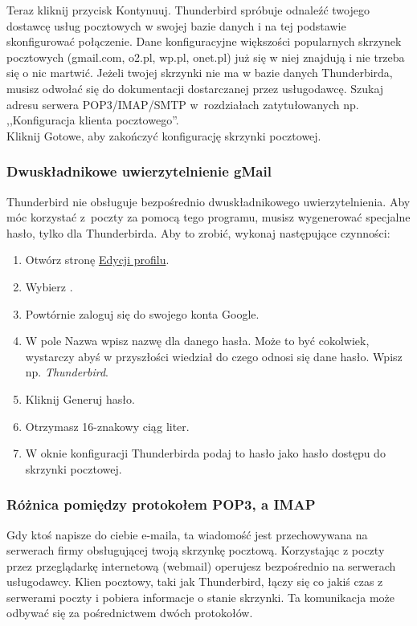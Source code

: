 Teraz kliknij przycisk \textcolor{ubuntu_orange}{Kontynuuj}. Thunderbird spróbuje odnaleźć twojego dostawcę usług pocztowych w swojej bazie danych i na tej podstawie skonfigurować połączenie. Dane konfiguracyjne większości popularnych skrzynek pocztowych (gmail.com, o2.pl, wp.pl, onet.pl) już się w niej znajdują i nie trzeba się o nic martwić. Jeżeli twojej skrzynki nie ma w bazie danych Thunderbirda, musisz odwołać się do dokumentacji dostarczanej przez usługodawcę. Szukaj adresu serwera POP3/IMAP/SMTP w~rozdziałach zatytułowanych np. ,,Konfiguracja klienta pocztowego''.\\
Kliknij \textcolor{ubuntu_orange}{Gotowe}, aby zakończyć konfigurację skrzynki pocztowej.

\subsubsection{Dwuskładnikowe uwierzytelnienie gMail}
Thunderbird nie obsługuje bezpośrednio dwuskładnikowego uwierzytelnienia. Aby móc korzystać z~poczty za pomocą tego programu, musisz wygenerować specjalne hasło, tylko dla Thunderbirda. Aby to zrobić, wykonaj następujące czynności:
\begin{enumerate}
\item Otwórz stronę \href{https://www.google.com/settings/personalinfo}{Edycji profilu}.
\item Wybierz .
\item Powtórnie zaloguj się do swojego konta Google.
\item W pole \textcolor{ubuntu_orange}{Nazwa} wpisz nazwę dla danego hasła. Może to być cokolwiek, wystarczy abyś w przyszłości wiedział do czego odnosi się dane hasło. Wpisz np. \textit{Thunderbird}.
\item Kliknij \textcolor{ubuntu_orange}{Generuj hasło}.
\item Otrzymasz 16-znakowy ciąg liter. 
\item W oknie konfiguracji Thunderbirda podaj to hasło jako hasło dostępu do skrzynki pocztowej.
\end{enumerate}

\subsubsection{Różnica pomiędzy protokołem POP3, a IMAP}
Gdy ktoś napisze do ciebie e-maila, ta wiadomość jest przechowywana na serwerach firmy obsługującej twoją skrzynkę pocztową. Korzystając z poczty przez przeglądarkę internetową (webmail) operujesz bezpośrednio na serwerach usługodawcy. Klien pocztowy, taki jak Thunderbird, łączy się co jakiś czas z serwerami poczty i pobiera informacje o stanie skrzynki. Ta komunikacja może odbywać się za pośrednictwem dwóch protokołów.

